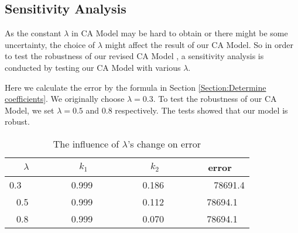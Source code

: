 \documentclass{mcmthesis}
\begin{document}
\subsection{Sensitivity Analysis}
  As the constant $\lambda$ in CA Model may be hard to obtain or there might be some uncertainty, the choice of $\lambda$ might affect the result of our CA Model. So in order to test the robustness of our revised CA Model , a sensitivity analysis is conducted by testing our CA Model with various $\lambda$. \par
  Here we calculate the error by the formula in Section \ref{Section:Determine coefficients}. We originally choose $\lambda=0.3$. To test the robustness of our CA Model, we set $\lambda=0.5$ and $0.8$ respectively. The tests showed that our model is robust.

  \begin{table}[!h]
\centering
\caption{The influence of $\lambda$'s change on error} %
\begin{tabular}{ccc|c}
\toprule[2.5pt]
$\lambda$ & $k_1$ & $k_2$ & error \\
\midrule[1.5pt]
0.3 \ \ \ \ &  \ \ \ \ 0.999 \ \ \ \ & \ \ \ \ 0.186 \ \ \ \ & \ \ \ \ 78691.4 \\
\midrule
0.5 \ & \ 0.999 \ & \ 0.112 \ & \ 78694.1 \\
\midrule
0.8 \ & \ 0.999 \ & \ 0.070 \ & \ 78694.1 \\
\bottomrule
\end{tabular}
\end{table}


\begin{thebibliography}{99}

\end{thebibliography}

\begin{appendices}


\end{appendices}
\end{document}
